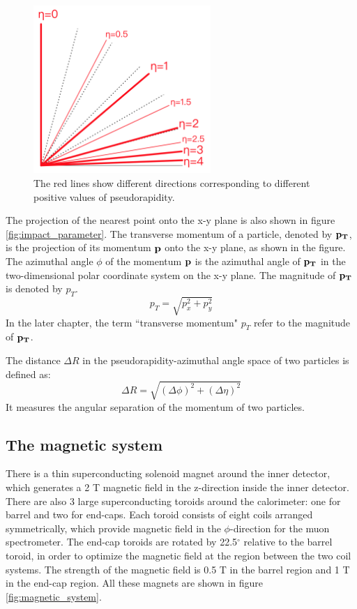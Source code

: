 \begin{figure}
\centering
\includegraphics[width=0.6\textwidth]{data/photo/detector/pseudorapidity.png}
\caption{The red lines show different directions corresponding to different positive values of pseudorapidity. \cite{pseudorapidity}}
\label{fig:pseudorapidity}
\end{figure}

The projection of the nearest point onto the x-y plane is also shown in figure \ref{fig:impact_parameter}.
The transverse momentum of a particle, denoted by $\bf{p}_T$, is the projection of its momentum $\bf{p}$ onto the x-y plane, as shown in the figure.
The azimuthal angle $\phi$ of the momentum $\bf{p}$ is the azimuthal angle of $\bf{p}_T$ in the two-dimensional polar coordinate system on the x-y plane.
The magnitude of $\bf{p}_T$ is denoted by $p_T$.
\begin{equation}
p_T = \sqrt{p_x^2 + p_y^2}
\end{equation}
In the later chapter, the term ``transverse momentum" $p_T$ refer to the magnitude of $\bf{p}_T$.

The distance $\Delta R$ in the pseudorapidity-azimuthal angle space of two particles is defined as:
\begin{equation}
\Delta R = \sqrt{(\Delta \phi) ^2 + (\Delta \eta) ^2}
\end{equation}
It measures the angular separation of the momentum of two particles.

\subsection{The magnetic system}
\label{sec:magnetic_system}
There is a thin superconducting solenoid magnet around the inner detector, which generates a 2 T magnetic field in the z-direction inside the inner detector.
There are also 3 large superconducting toroids around the calorimeter: one for barrel and two for end-caps.
Each toroid consists of eight coils arranged symmetrically, which provide magnetic field in the $\phi$-direction for the muon spectrometer.
The end-cap toroids are rotated by 22.5$^{\circ}$ relative to the barrel toroid, in order to optimize the magnetic field at the region between the two coil systems.
The strength of the magnetic field is 0.5 T in the barrel region and 1 T in the end-cap region.
All these magnets are shown in figure \ref{fig:magnetic_system}.


